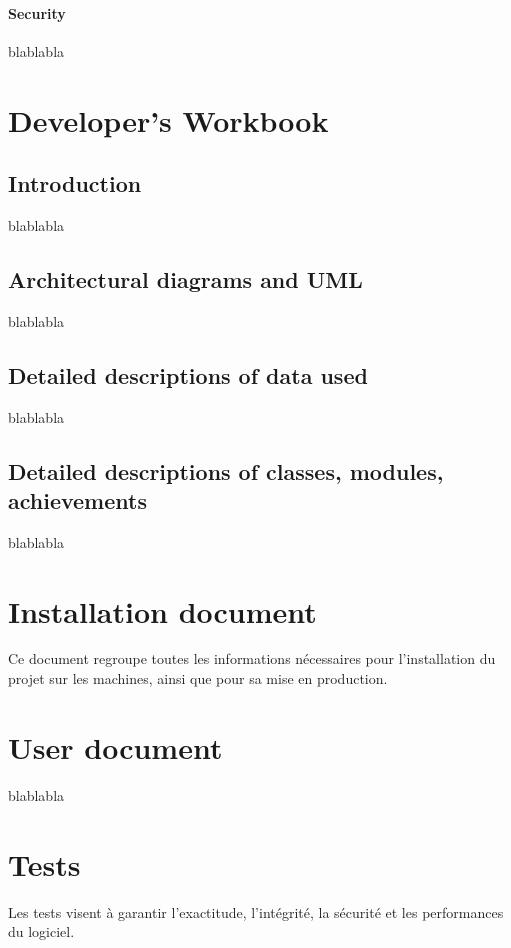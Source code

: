 \documentclass{polytech/polytech}
\numberwithin{figure}{chapter}
\begin{document}
\begin{appendix}
\subsubsection{Security}
blablabla


\chapter{Developer's Workbook}

\section{Introduction}

blablabla

\section{Architectural diagrams and UML}

blablabla

\section{Detailed descriptions of data used}

blablabla

\section{Detailed descriptions of classes, modules, achievements}

blablabla


\chapter{Installation document}

Ce document regroupe toutes les informations nécessaires
pour l’installation du projet sur les machines,
ainsi que pour sa mise en production.

\chapter{User document}

blablabla

\chapter{Tests}

Les tests  visent à garantir l'exactitude,
l'intégrité, la sécurité et les performances du logiciel. 


\end{appendix}
\end{document}

